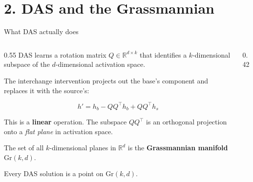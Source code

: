 \documentclass[aspectratio=169,11pt]{beamer}
\newcommand{\Gr}{\mathrm{Gr}}
\newcommand{\R}{\mathbb{R}}
\begin{document}
\section{2. DAS and the Grassmannian}

\begin{frame}{What DAS actually does}

\begin{columns}[T]
\begin{column}{0.55\textwidth}
{\small DAS learns a rotation matrix $Q \in \R^{d \times k}$ that identifies a $k$-dimensional subspace of the $d$-dimensional activation space.}

\vspace{0.3em}
{\small The interchange intervention projects out the base's component and replaces it with the source's:}

$$h' = h_b - QQ^\top h_b + QQ^\top h_s$$

{\small This is a \textbf{linear} operation. The subspace $QQ^\top$ is an orthogonal projection onto a \emph{flat plane} in activation space.}

\vspace{0.3em}
{\small The set of all $k$-dimensional planes in $\R^d$ is the \textbf{Grassmannian manifold} $\Gr(k,d)$.}

\vspace{0.3em}
{\small Every DAS solution is a point on $\Gr(k,d)$.}
\end{column}
\begin{column}{0.42\textwidth}
\end{column}
\end{columns}
\end{frame}
\end{document}
